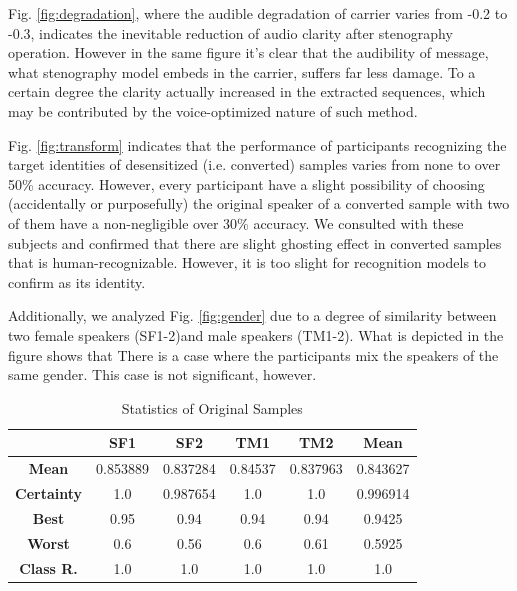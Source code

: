 \documentclass[conference]{IEEEtran}
\begin{document}
Fig. \ref{fig:degradation}, where the audible degradation of carrier varies from -0.2 to -0.3, indicates the inevitable reduction of audio clarity after stenography operation. However in the same figure it's clear that the audibility of message, what stenography model embeds in the carrier, suffers far less damage. To a certain degree the clarity actually increased in the extracted sequences, which may be contributed by the voice-optimized nature of such method.

Fig. \ref{fig:transform} indicates that the performance of participants recognizing the target identities of desensitized (i.e. converted) samples varies from none to over 50\% accuracy. However, every participant have a slight possibility of choosing (accidentally or purposefully) the original speaker of a converted sample with two of them have a non-negligible over 30\% accuracy. We consulted with these subjects and confirmed that there are slight ghosting effect in converted samples that is human-recognizable. However, it is too slight for recognition models to confirm as its identity.

Additionally, we analyzed Fig. \ref{fig:gender} due to a degree of similarity between two female speakers (SF1-2)and male speakers (TM1-2). What is depicted in the figure shows that There is a case where the participants mix the speakers of the same gender. This case is not significant, however.

\begin{table}[!t]
    \centering
    \caption{Statistics of Original Samples}
    \begin{tabular}{|c|c|c|c|c|c|}
        \hline
        & \textbf{SF1} & \textbf{SF2} & \textbf{TM1} & \textbf{TM2} & \textbf{Mean} \\
        \hline
        \textbf{Mean} & 0.853889 & 0.837284 & 0.84537 & 0.837963 & 0.843627 \\
        \hline
        \textbf{Certainty} & 1.0 & 0.987654 & 1.0 & 1.0 & 0.996914 \\
        \hline
        \textbf{Best} & 0.95 & 0.94 & 0.94 & 0.94 & 0.9425\\
        \hline
        \textbf{Worst} & 0.6 & 0.56 & 0.6 & 0.61 & 0.5925\\
        \hline
        \textbf{Class R.} & 1.0 & 1.0 & 1.0 & 1.0 & 1.0\\
        \hline
    \end{tabular}
    \label{tab:st_org}
\end{table}
\end{document}
